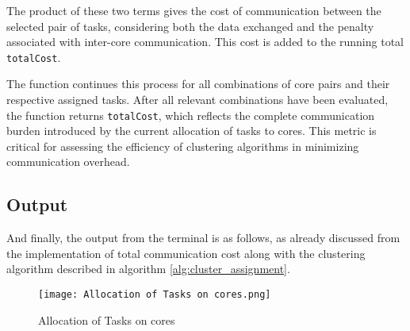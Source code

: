 \documentclass[conference]{IEEEtran}
\begin{document}
The product of these two terms gives the cost of communication between the selected pair of tasks, considering both the data exchanged and the penalty associated with inter-core communication. This cost is added to the running total \texttt{totalCost}.

The function continues this process for all combinations of core pairs and their respective assigned tasks. After all relevant combinations have been evaluated, the function returns \texttt{totalCost}, which reflects the complete communication burden introduced by the current allocation of tasks to cores. This metric is critical for assessing the efficiency of clustering algorithms in minimizing communication overhead.







\subsection{Output}
\label{subsec: Output}
And finally, the output from the terminal is as follows, as already discussed from the implementation of total communication cost along with the clustering algorithm described in algorithm \ref{alg:cluster_assignment}. 

\begin{figure}[h!]
    \centering
    \texttt{[image: Allocation of Tasks on cores.png]}
    \caption{Allocation of Tasks on cores}
    \label{fig:enter-label}
\end{figure}
\end{document}
